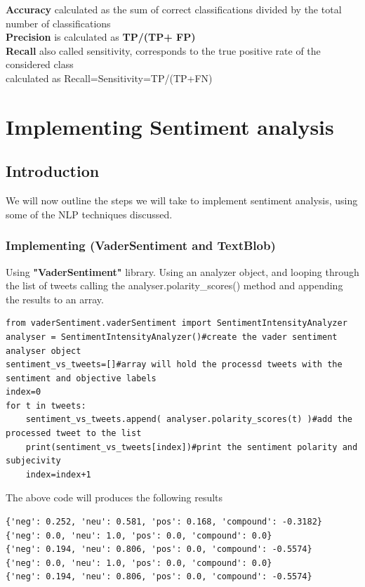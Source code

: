 \textbf{Accuracy} calculated as the sum of correct classifications divided by the total number of classifications\\
\textbf{Precision} is calculated as \textbf{ TP/(TP+ FP)}\\
\textbf{Recall} also called sensitivity, corresponds to the true positive rate of the considered class
\\
calculated as Recall=Sensitivity=TP/(TP+FN)

\clearpage



\chapter{Implementing Sentiment analysis}

\section{Introduction}
We will now outline the steps we will take to implement sentiment analysis, using some of the NLP techniques discussed.

\subsection{Implementing (VaderSentiment and TextBlob)}


Using \textbf{"VaderSentiment"} library. Using an analyzer object, and looping through the list of tweets  calling the analyser.polarity\_scores() method and appending the results to an array.

\begin{lstlisting}
from vaderSentiment.vaderSentiment import SentimentIntensityAnalyzer
analyser = SentimentIntensityAnalyzer()#create the vader sentiment analyser object
sentiment_vs_tweets=[]#array will hold the processd tweets with the sentiment and objective labels
index=0
for t in tweets:
    sentiment_vs_tweets.append( analyser.polarity_scores(t) )#add the processed tweet to the list
    print(sentiment_vs_tweets[index])#print the sentiment polarity and subjecivity
    index=index+1
\end{lstlisting}


The above code will produces the following results

\begin{lstlisting}
{'neg': 0.252, 'neu': 0.581, 'pos': 0.168, 'compound': -0.3182}
{'neg': 0.0, 'neu': 1.0, 'pos': 0.0, 'compound': 0.0}
{'neg': 0.194, 'neu': 0.806, 'pos': 0.0, 'compound': -0.5574}
{'neg': 0.0, 'neu': 1.0, 'pos': 0.0, 'compound': 0.0}
{'neg': 0.194, 'neu': 0.806, 'pos': 0.0, 'compound': -0.5574}
\end{lstlisting}




